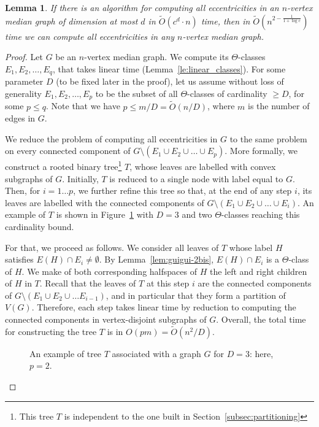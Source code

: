 \documentclass{article}
\newtheorem{lemma}{Lemma}
\begin{document}
\begin{lemma}\label{lem:guigui-4}
If there is an algorithm for computing all eccentricities in an $n$-vertex median graph of dimension at most $d$ in $\tilde{O}(c^d \cdot n)$ time, then in $\tilde{O}(n^{2 - \frac 1 {1+\log{c}}})$ time we can compute all eccentricities in {\em any} $n$-vertex median graph.
\end{lemma}
\begin{proof}
Let $G$ be an $n$-vertex median graph.
We compute its $\Theta$-classes $E_1,E_2,\ldots,E_q$, that takes linear time (Lemma~\ref{le:linear_classes}).
For some parameter $D$ (to be fixed later in the proof), let us assume without loss of generality $E_1,E_2,\ldots,E_p$ to be the subset of all $\Theta$-classes of cardinality $\geq D$, for some $p \leq q$. Note that we have $p \leq m/D = \tilde{O}(n/D)$, where $m$ is the number of edges in $G$.

We reduce the problem of computing all eccentricities in $G$ to the same problem on every connected component of $G \setminus (E_1 \cup E_2 \cup \ldots \cup E_p)$. 
More formally, we construct a rooted binary tree\footnote{This tree $T$ is independent to the one built in Section~\ref{subsec:partitioning}} $T$, whose leaves are labelled with convex subgraphs of $G$.
Initially, $T$ is reduced to a single node with label equal to $G$.
Then, for $i = 1 \ldots p$, we further refine this tree so that, at the end of any step $i$, its leaves are labelled with the connected components of $G \setminus \left(E_1 \cup E_2 \cup \ldots \cup E_i\right)$. An example of $T$ is shown in Figure~\ref{fig:reduction} with $D=3$ and two $\Theta$-classes reaching this cardinality bound.

For that, we proceed as follows.
We consider all leaves of $T$ whose label $H$ satisfies $E(H) \cap E_i \neq \emptyset$.
By Lemma~\ref{lem:guigui-2bis}, $E(H) \cap E_i$ is a $\Theta$-class of $H$.
We make of both corresponding halfspaces of $H$ the left and right children of $H$ in $T$. 
Recall that the leaves of $T$ at this step $i$ are the connected components of $G \setminus (E_1 \cup E_2 \cup \ldots E_{i-1})$, and in particular that they form a partition of $V(G)$.
Therefore, each step takes linear time by reduction to computing the connected components in vertex-disjoint subgraphs of $G$.
Overall, the total time for constructing the tree $T$ is in ${O}(pm) = \tilde{O}(n^2/D)$.

\begin{figure}[h]
\centering
\scalebox{0.7}{}
\caption{An example of tree $T$ associated with a graph $G$ for $D=3$: here, $p=2$.}
\label{fig:reduction}
\end{figure}


\end{proof}
\end{document}
